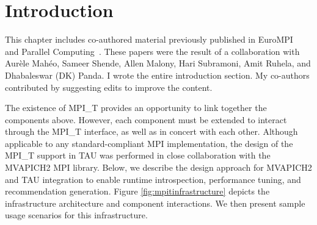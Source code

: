 \chapter{Introduction}
This chapter includes co-authored material previously published in EuroMPI~\cite{EuroMPI} and Parallel Computing~\cite{ParCo}. These papers were the result of a collaboration with Aur\`{e}le Mah\'{e}o, Sameer Shende, Allen Malony, Hari Subramoni, Amit Ruhela, and Dhabaleswar (DK) Panda. I wrote the entire introduction section. My co-authors contributed by suggesting edits to improve the content. 
\par The existence of MPI\_T provides an opportunity to link together the components above. However, each component must be extended to interact through the MPI\_T interface, as well as in concert with each other. Although applicable to any standard-compliant MPI implementation, the design of the MPI\_T support in TAU was performed in close collaboration with the MVAPICH2 MPI library. Below, we describe the design approach for MVAPICH2 and TAU integration to enable runtime introspection, performance tuning, and recommendation generation. Figure \ref{fig:mpitinfrastructure} depicts the infrastructure architecture and component interactions. We then present sample usage scenarios for this infrastructure. 

